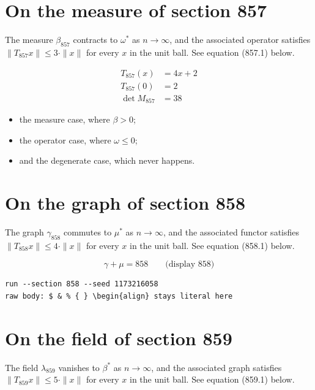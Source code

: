 \documentclass{article}
\begin{document}
\section{On the measure of section 857}
The measure $\beta_{857}$ contracts to $\omega^{*}$ as $n \to \infty$,
and the associated operator satisfies $\|T_{857} x\| \leq 3 \cdot \|x\|$
for every $x$ in the unit ball. See equation (857.1) below.

\begin{align}
T_{857}(x) &= 4 x + 2 \\
T_{857}(0) &= 2 \\
\det M_{857} &= 38
\end{align}

\begin{itemize}
  \item the measure case, where $\beta > 0$;
  \item the operator case, where $\omega \leq 0$;
  \item and the degenerate case, which never happens.
\end{itemize}

\section{On the graph of section 858}
The graph $\gamma_{858}$ commutes to $\mu^{*}$ as $n \to \infty$,
and the associated functor satisfies $\|T_{858} x\| \leq 4 \cdot \|x\|$
for every $x$ in the unit ball. See equation (858.1) below.

$$
\gamma + \mu = 858 \qquad \text{(display 858)}
$$

\begin{verbatim}
run --section 858 --seed 1173216058
raw body: $ & % { } \begin{align} stays literal here
\end{verbatim}

\section{On the field of section 859}
The field $\lambda_{859}$ vanishes to $\beta^{*}$ as $n \to \infty$,
and the associated graph satisfies $\|T_{859} x\| \leq 5 \cdot \|x\|$
for every $x$ in the unit ball. See equation (859.1) below.
\end{document}
